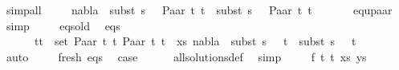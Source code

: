 \begin{isabellebody}
\ simp{\isacharunderscore}{\kern0pt}all\isanewline
\ \ \ \isamarkupfalse%
\ {\isachardoublequoteopen}nabla{}\ {\isasymturnstile}\ subst\ {\isacharparenleft}{\kern0pt}s{}\ {\isasymbullet}\ {\isacharbrackleft}{\kern0pt}{\isacharbrackright}{\kern0pt}{\isacharparenright}{\kern0pt}\ {\isacharparenleft}{\kern0pt}Paar\ t{}\ t{}{\isacharparenright}{\kern0pt}\ {\isasymapprox}\ subst\ {\isacharparenleft}{\kern0pt}s{}\ {\isasymbullet}\ {\isacharbrackleft}{\kern0pt}{\isacharbrackright}{\kern0pt}{\isacharparenright}{\kern0pt}\ {\isacharparenleft}{\kern0pt}Paar\ t{}\ t{}{\isacharparenright}{\kern0pt}{\isachardoublequoteclose}\isanewline
\ \ \ \ \ \isamarkupfalse%
\ equ{\isacharunderscore}{\kern0pt}paar\ \isamarkupfalse%
\ simp\isanewline
\ \ \ \isamarkupfalse%
\ eqs{\isacharunderscore}{\kern0pt}old\ \isamarkupfalse%
\ eqs{\isacharcolon}{\kern0pt}\isanewline
\ \ \ \ \ {\isachardoublequoteopen}{\isasymforall}\ {\isacharparenleft}{\kern0pt}t{}{\isacharcomma}{\kern0pt}t{}{\isacharparenright}{\kern0pt}\ {\isasymin}\ set\ {\isacharparenleft}{\kern0pt}{\isacharparenleft}{\kern0pt}Paar\ t{}\ t{}{\isacharcomma}{\kern0pt}\ Paar\ t{}\ t{}{\isacharparenright}{\kern0pt}\ {\isacharhash}{\kern0pt}\ xs{\isacharparenright}{\kern0pt}{\isachardot}{\kern0pt}\ nabla{}\ {\isasymturnstile}\ subst\ {\isacharparenleft}{\kern0pt}s{}\ {\isasymbullet}\ {\isacharbrackleft}{\kern0pt}{\isacharbrackright}{\kern0pt}{\isacharparenright}{\kern0pt}\ t{}\ {\isasymapprox}\ subst\ {\isacharparenleft}{\kern0pt}s{}\ {\isasymbullet}\ {\isacharbrackleft}{\kern0pt}{\isacharbrackright}{\kern0pt}{\isacharparenright}{\kern0pt}\ t{}{\isachardoublequoteclose}\isanewline
\ \ \ \ \ \isamarkupfalse%
\ auto\isanewline
\ \ \ \isamarkupfalse%
\ fresh\ eqs\ \isamarkupfalse%
\ {\isacharquery}{\kern0pt}case\isanewline
\ \ \ \ \isamarkupfalse%
\ all{\isacharunderscore}{\kern0pt}solutions{\isacharunderscore}{\kern0pt}def\ \isamarkupfalse%
\ simp\isanewline
{}\isamarkupfalse%
\isanewline
\ \ \isamarkupfalse%
\ {\isacharparenleft}{\kern0pt}{}\ f\ t{}\ t{}\ xs\ ys{\isacharparenright}{\kern0pt}\isanewline
\ \ \isamarkupfalse%

\end{isabellebody}
